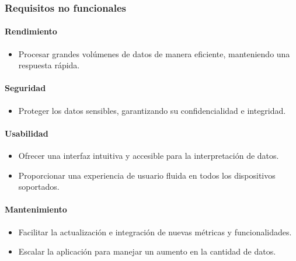\subsubsection{Requisitos no funcionales}
\label{subsubsec:analisis_requisitos_analisis_no_funcionales}

\paragraph{Rendimiento}
\label{par:analisis_requisitos_analisis_no_funcionales_rendimiento}

\begin{itemize}
    \item Procesar grandes volúmenes de datos de manera eficiente, manteniendo una respuesta rápida.
\end{itemize}

\paragraph{Seguridad}
\label{par:analisis_requisitos_analisis_no_funcionales_seguridad}

\begin{itemize}
    \item Proteger los datos sensibles, garantizando su confidencialidad e integridad.
\end{itemize}

\paragraph{Usabilidad}
\label{par:analisis_requisitos_analisis_no_funcionales_usabilidad}

\begin{itemize}
    \item Ofrecer una interfaz intuitiva y accesible para la interpretación de datos.
    \item Proporcionar una experiencia de usuario fluida en todos los dispositivos soportados.
\end{itemize}

\paragraph{Mantenimiento}
\label{par:analisis_requisitos_analisis_no_funcionales_mantenimiento}

\begin{itemize}
    \item Facilitar la actualización e integración de nuevas métricas y funcionalidades.
    \item Escalar la aplicación para manejar un aumento en la cantidad de datos.
\end{itemize}


